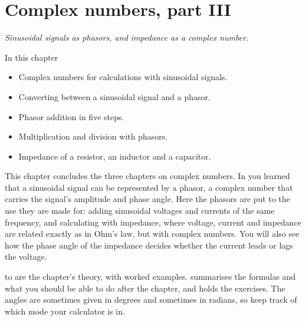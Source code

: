 
\chapter{Complex numbers, part III}
\label{c17:ch}

{\large\itshape Sinusoidal signals as phasors, and impedance as a complex number.\par}

\begin{chapterbox}{In this chapter}
\begin{itemize}
  \item Complex numbers for calculations with sinusoidal signals.
  \item Converting between a sinusoidal signal and a phasor.
  \item Phasor addition in five steps.
  \item Multiplication and division with phasors.
  \item Impedance of a resistor, an inductor and a capacitor.
\end{itemize}
\end{chapterbox}

This chapter concludes the three chapters on complex numbers. In  you learned that a
sinusoidal signal can be represented by a phasor, a complex number that carries the signal's
amplitude and phase angle. Here the phasors are put to the use they are made for: adding
sinusoidal voltages and currents of the same frequency, and calculating with impedance, where
voltage, current and impedance are related exactly as in Ohm's law, but with complex numbers. You
will also see how the phase angle of the impedance decides whether the current leads or lags the
voltage.

 to  are the chapter's theory, with worked
examples.  summarises the formulas and what you should be able to
do after the chapter, and  holds the exercises. The angles are sometimes
given in degrees and sometimes in radians, so keep track of which mode your calculator is in.




